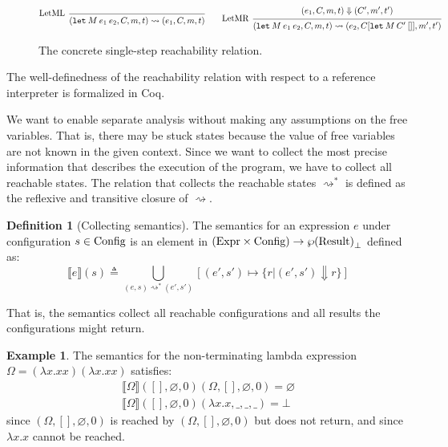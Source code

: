 \documentclass[acmsmall,screen]{acmart}
\theoremstyle{definition}
\newtheorem{definition}{Definition}[section]
\newtheorem{example}{Example}[section]
\newcommand*{\Expr}{\text{Expr}}
\newcommand*{\Time}{\mathbb{T}}
\newcommand*{\mem}{m}
\newcommand*{\Config}[1]{\text{Config}\vphantom{#1}}
\newcommand*{\Result}[1]{\text{Result}\vphantom{#1}}
\newcommand*{\sembracket}[1]{\lBrack{#1}\rBrack}
\begin{document}
\begin{figure}[htb]
  \[
    \begin{prooftree}
      \infer[left label=LetML]0{
      (\mathtt{let}\:M\:e_{1}\:e_{2}, C, \mem, t)
      \rightsquigarrow
      (e_{1}, C, \mem, t)
      }
    \end{prooftree}\qquad
    \begin{prooftree}
      \hypo{
        \begin{matrix}
          (e_{1}, C, \mem, t)
          \Downarrow
          (C', \mem', t')
        \end{matrix}
      }
      \infer[left label=LetMR]1{
      (\mathtt{let}\:M\:e_{1}\:e_{2}, C, \mem, t)
      \rightsquigarrow
      (e_{2}, C[\mathtt{let}\:M\:C'\:[]], \mem', t')
      }
    \end{prooftree}
  \]
  \caption{The concrete single-step reachability relation.}
\end{figure}
The well-definedness of the reachability relation with respect to a reference interpreter is formalized in Coq.

We want to enable separate analysis without making any assumptions on the free variables.
That is, there may be stuck states because the value of free variables are not known in the given context.
Since we want to collect the most precise information that describes the execution of the program, we have to collect all reachable states.
The relation that collects the reachable states $\rightsquigarrow^{*}$ is defined as the reflexive and transitive closure of $\rightsquigarrow$.

\begin{definition}[Collecting semantics]
  The semantics for an expression $e$ under configuration $s\in\Config{\Time}$ is an element in $(\Expr\times\Config{\Time})\rightarrow{\wp(\Result{\Time})}_{\bot}$ defined as:
  \[
    \sembracket{e}(s)\triangleq\bigcup_{(e,s)\rightsquigarrow^{*}(e',s')}[(e',s')\mapsto\{r|(e',s')\Downarrow r\}]
  \]

  That is, the semantics collect all reachable configurations and all results the configurations might return.
\end{definition}

\begin{example}
  The semantics for the non-terminating lambda expression $\Omega=(\lambda x.xx)(\lambda x.xx)$ satisfies:
  \begin{align*}
    \sembracket{\Omega}([],\varnothing,0)(\Omega,[],\varnothing,0)=\varnothing \\
    \sembracket{\Omega}([],\varnothing,0)(\lambda x.x,\_,\_,\_)=\bot
  \end{align*}
  since $(\Omega,[],\varnothing,0)$ is reached by $(\Omega,[],\varnothing,0)$ but does not return, and since $\lambda x.x$ cannot be reached.
\end{example}
\end{document}
